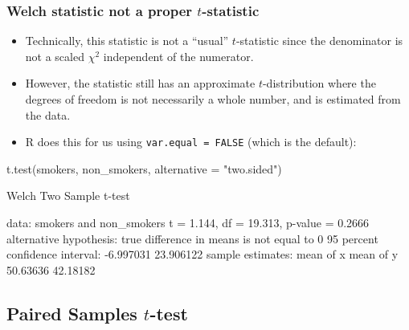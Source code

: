 \documentclass[a4paper]{article}
\begin{document}
\subsubsection{Welch statistic not a proper \( t \)-statistic}
\begin{itemize}
	\item Technically, this statistic is not a ``usual'' \( t \)-statistic since the denominator is not a scaled \( \chi^2 \) independent of the numerator.
	\item However, the statistic still has an approximate \( t \)-distribution where the degrees of freedom is not necessarily a whole number, and is estimated from the data.
	\item R does this for us using \lstinline|var.equal = FALSE| (which is the default):
\end{itemize}
\begin{Schunk}
\begin{Sinput}
t.test(smokers, non_smokers, alternative = "two.sided")
\end{Sinput}
\begin{Soutput}

	Welch Two Sample t-test

data:  smokers and non_smokers
t = 1.144, df = 19.313, p-value = 0.2666
alternative hypothesis: true difference in means is not equal to 0
95 percent confidence interval:
 -6.997031 23.906122
sample estimates:
mean of x mean of y 
 50.63636  42.18182 
\end{Soutput}
\end{Schunk}
\subsection{Paired Samples \( t \)-test}
\end{document}
